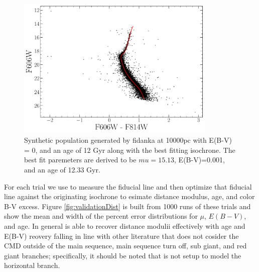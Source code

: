 \begin{figure}
  \centering
  \includegraphics[width=0.85\textwidth]{figures/ngc2808/ExtractedIsoFit.pdf}
  \caption{Synthetic population generated by fidanka at 10000pc with E(B-V) = 0, and an age of 12 Gyr along with the best fitting isochrone. The best fit paremeters are derived to be $mu=15.13$, E(B-V)=0.001, and an age of 12.33 Gyr.}
  \label{fig:ValidationBestFit}
\end{figure}

For each trial we use \fidanka to measure the fiducial line and then optimize that fiducial line against the originating isochrone to esimate distance modulus, age, and color B-V excess. Figure \ref{fig:validationDist} is built from 1000 runs of these trials and show the mean and width of the percent error distributions for $\mu$, $E(B-V)$, and age. In general \fidanka is able to recover distance modulii effectively with age and E(B-V) reovery falling in line with other literature that does not cosider the CMD outside of the main sequence, main sequence turn off, sub giant, and red giant branches; specifically, it should be noted that \fidanka is not setup to model the horizontal branch.

